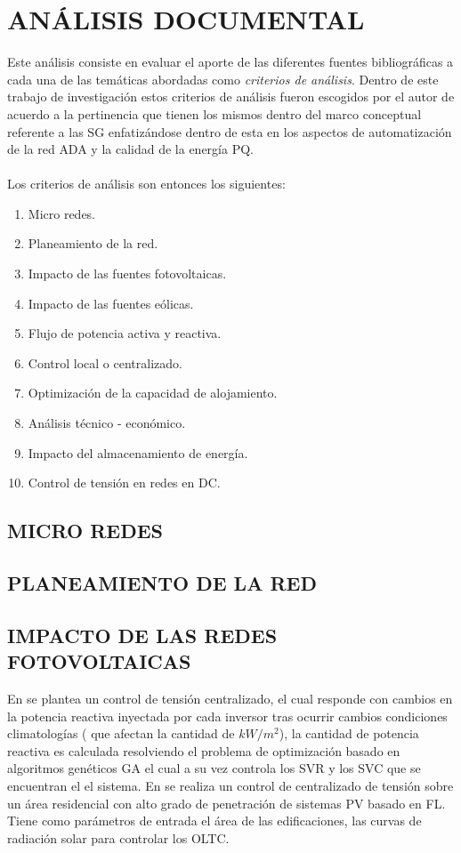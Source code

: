 \documentclass[12pt, letterpaper]{report}
\begin{document}
\chapter{ANÁLISIS DOCUMENTAL}
\label{cap:documental}

Este  análisis  consiste en evaluar el aporte de las diferentes fuentes bibliográficas a cada una de las temáticas abordadas  como \textit{criterios de análisis}. Dentro de este trabajo de investigación estos criterios de análisis fueron escogidos por el autor de acuerdo a la pertinencia que tienen los mismos dentro del marco conceptual referente a las \ac{SG} enfatizándose dentro de esta en los aspectos de  automatización de la red \ac{ADA} y la calidad de la energía \ac{PQ}.\\\\ 

Los criterios de análisis son entonces los siguientes:

\begin{enumerate}
    \item Micro redes.
    \item Planeamiento de la red.
    \item Impacto de las fuentes fotovoltaicas.
    \item Impacto de las fuentes eólicas.
    \item Flujo de potencia activa y reactiva.
    \item Control local  o centralizado.
    \item Optimización de la capacidad de alojamiento.
    \item Análisis técnico - económico.
    \item Impacto del almacenamiento de energía.
    \item Control de tensión en redes en DC.
\end{enumerate}

\section{MICRO REDES}
\section{PLANEAMIENTO DE LA RED}

\section{IMPACTO DE LAS REDES FOTOVOLTAICAS}

En \cite{Oshiro2011a} se plantea un control de tensión centralizado,  el cual responde con  cambios en la potencia reactiva inyectada por cada inversor tras  ocurrir cambios condiciones climatologías ( que afectan la cantidad de $kW/m^{2}$), la cantidad de potencia reactiva es calculada resolviendo el problema de optimización  basado en algoritmos genéticos \ac{GA} el cual a su vez controla los \ac{SVR}  y los \ac{SVC} que se encuentran el el sistema. 
En \cite{Shalwala2011a} se realiza un control de centralizado  de tensión sobre un área residencial con alto grado de penetración de sistemas \ac{PV} basado en \ac{FL}. Tiene como parámetros  de entrada el área de las edificaciones, las curvas de radiación solar para controlar los \ac{OLTC}.  
\end{document}
